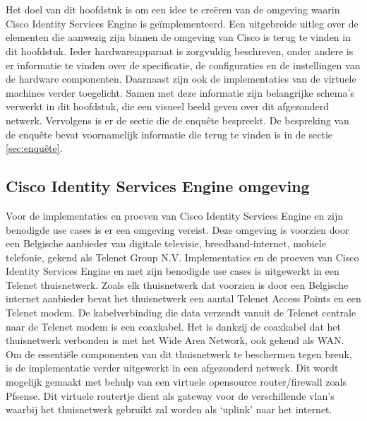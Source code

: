 
\chapter{}
\label{ch:Proof of concept}

Het doel van dit hoofdstuk is om een idee te creëren van de omgeving waarin Cisco Identity Services Engine is geïmplementeerd. Een uitgebreide uitleg over de elementen die aanwezig zijn binnen de omgeving van Cisco is terug te vinden in dit hoofdstuk. Ieder hardwareapparaat is zorgvuldig beschreven, onder andere is er informatie te vinden over de specificatie, de configuraties en de instellingen van de hardware componenten. Daarnaast zijn ook de implementaties van de virtuele machines verder toegelicht.
\newline
\newline
Samen met deze informatie zijn belangrijke schema’s verwerkt in dit hoofdstuk, die een visueel beeld geven over dit afgezonderd netwerk. 
Vervolgens is er de sectie die de enquête bespreekt. De bespreking van de enquête bevat voornamelijk informatie die terug te vinden is in de sectie \ref{sec:enquête}. 

\section{Cisco Identity Services Engine omgeving}

Voor de implementaties en proeven van Cisco Identity Services Engine en zijn benodigde use cases is er een omgeving vereist. Deze omgeving is voorzien door een Belgische aanbieder van digitale televisie, breedband-internet, mobiele telefonie, gekend als Telenet Group N.V. Implementaties en de proeven van Cisco Identity Services Engine en met zijn benodigde use cases is uitgewerkt in een Telenet thuisnetwerk.
\newline
\newline
Zoals elk thuisnetwerk dat voorzien is door een Belgische internet aanbieder bevat het thuisnetwerk een aantal Telenet Access Points en een Telenet modem. De kabelverbinding die data verzendt vanuit de Telenet centrale naar de Telenet modem is een coaxkabel. Het is dankzij de coaxkabel dat het thuisnetwerk verbonden is met het Wide Area Network, ook gekend als WAN.
\newline
\newline
Om de essentiële componenten van dit thuisnetwerk te beschermen tegen breuk, is de implementatie verder uitgewerkt in een afgezonderd netwerk. Dit wordt mogelijk gemaakt met behulp van een virtuele opensource router/firewall zoals Pfsense. Dit virtuele routertje dient als gateway voor de verschillende vlan’s waarbij het thuisnetwerk gebruikt zal worden als ‘uplink’ naar het internet. 



